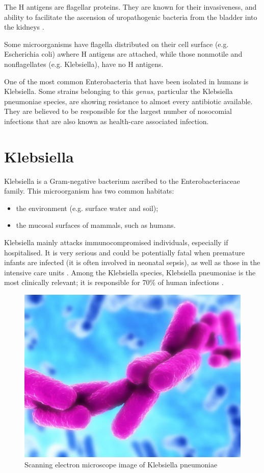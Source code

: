 \documentclass[11pt]{report}
\begin{document}
The H antigens are flagellar proteins. They are known for their invasiveness, and ability to facilitate the ascension of uropathogenic bacteria from the bladder into the kidneys \cite{wiles2008origins}.

Some microorganisms have flagella distributed on their cell surface (e.g. Escherichia coli) awhere H antigens are attached, while those nonmotile and nonflagellates (e.g. Klebsiella), have no H antigens.

One of the most common Enterobacteria that have been isolated in humans is Klebsiella.
Some strains belonging to this \emph{genus}, particular the Klebsiella pneumoniae species, are showing resistance to almost every antibiotic available. 
They are believed to be responsible for the largest number of nosocomial infections that are also known as health-care associated infection.

\section{Klebsiella}
Klebsiella is a Gram-negative bacterium ascribed to the Enterobacteriaceae family.
This microorganism has two common habitats: 

\begin{itemize}
\item the environment (e.g. surface water and soil);
\item the mucosal surfaces of mammals, such as humans.
\end{itemize}

Klebsiella mainly attacks immunocompromised individuals, especially if hospitalised.
It is very serious and could be potentially fatal when premature infants are infected (it is often involved in neonatal sepsis), as well as those in the intensive care units \cite{podschun1998klebsiella}.
Among the Klebsiella species, Klebsiella pneumoniae is the most clinically relevant; it is responsible for 70$\%$ of human infections \cite{Pitout2015}.

\begin{figure}[htp]
\centering
\includegraphics[scale=0.30]{img/Klebsiella_pneumoniae.jpg}
\caption{Scanning electron microscope image of Klebsiella pneumoniae}
\label{}
\end{figure}
\end{document}
